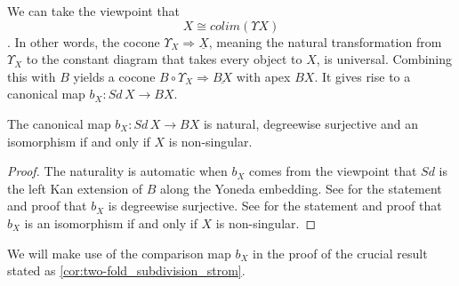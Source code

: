 We can take the viewpoint that
\[X\cong colim(\Upsilon X)\]
\cite[Lem.~4.2.1~(ii),~p.~141]{FP90}. In other words, the cocone $\Upsilon _X\Rightarrow \underline{X}$, meaning the natural transformation from $\Upsilon _X$ to the constant diagram that takes every object to $X$, is universal. Combining this with $B$ yields a cocone $B\circ \Upsilon _X\Rightarrow \underline{BX}$ with apex $BX$. It gives rise to a canonical map $b_X:Sd\, X\to BX$.
\begin{lemma}
\label{lem:properties_of_b_X}
The canonical map $b_X:Sd\, X\to BX$ is natural, degreewise surjective and an isomorphism if and only if $X$ is non-singular.
\end{lemma}
\begin{proof}
The naturality is automatic when $b_X$ comes from the viewpoint that $Sd$ is the left Kan extension of $B$ along the Yoneda embedding. See \cite[Lem.~2.2.10, p.~38]{WJR13} for the statement and proof that $b_X$ is degreewise surjective. See \cite[Lem.~2.2.11, p.~38]{WJR13} for the statement and proof that $b_X$ is an isomorphism if and only if $X$ is non-singular.
\end{proof}
\noindent We will make use of the comparison map $b_X$ in the proof of the crucial result stated as \cref{cor:two-fold_subdivision_strom}.

